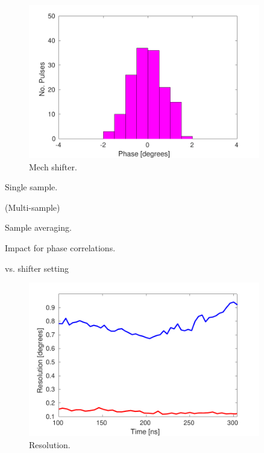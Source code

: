 \begin{figure}
  \centering
  \includegraphics[width=0.9\textwidth]{Figures/phaseMons/PhMon_HistMech}
  \caption{Mech shifter.}
  \label{f:PhMon_HistMech}
\end{figure}


Single sample.

(Multi-sample)

Sample averaging.

Impact for phase correlations.

vs. shifter setting

\begin{figure}
  \centering
  \includegraphics[width=0.9\textwidth]{Figures/phaseMons/PhMon_Resolution}
  \caption{Resolution.}
  \label{f:PhMon_Resolution}
\end{figure}











